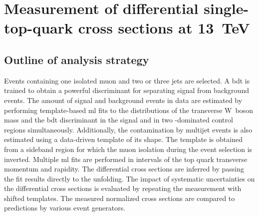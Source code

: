 \chapter{Measurement of differential single-top-quark cross sections at 13~TeV}
\label{ch:diff13}


\section{Outline of analysis strategy}

Events containing one isolated muon and two or three jets are selected. A \gls{bdt} is trained to obtain a powerful discriminant for separating signal from background events. The amount of signal and background events in data are estimated by performing template-based \gls{ml} fits to the distributions of the transverse W~boson mass and the \gls{bdt} discriminant in the signal and in two \ttbar-dominated control regions simultaneously. Additionally, the contamination by multijet events is also estimated using a data-driven template of its shape. The template is obtained from a sideband region for which the muon isolation during the event selection is inverted. Multiple \gls{ml} fits are performed in intervals of the top quark transverse momentum and rapidity. The differential cross sections are inferred by passing the fit results directly to the unfolding. The impact of systematic uncertainties on the differential cross sections is evaluated by repeating the measurement with shifted templates. The measured normalized cross sections are compared to predictions by various event generators.

